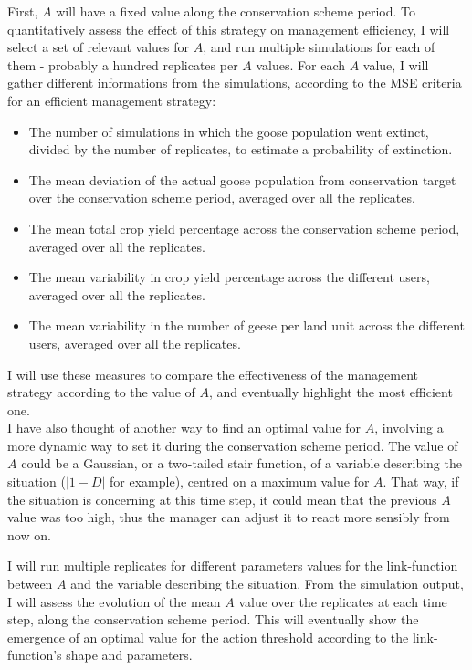 \documentclass[12pt,a4paper]{article}
\begin{document}
First, $A$ will have a fixed value along the conservation scheme period.
To quantitatively assess the effect of this strategy on management efficiency, I will select a set of relevant values for $A$, and run multiple simulations for each of them - probably a hundred replicates per $A$ values.
For each $A$ value, I will gather different informations from the simulations, according to the MSE criteria for an efficient management strategy:
\begin{itemize}
	\item The number of simulations in which the goose population went extinct, divided by the number of replicates, to estimate a probability of extinction.
	\item The mean deviation of the actual goose population from conservation target over the conservation scheme period, averaged over all the replicates.
	\item The mean total crop yield percentage across the conservation scheme period, averaged over all the replicates.
	\item The mean variability in crop yield percentage across the different users, averaged over all the replicates.
	\item The mean variability in the number of geese per land unit across the different users, averaged over all the replicates.
\end{itemize}
I will use these measures to compare the effectiveness of the management strategy according to the value of $A$, and eventually highlight the most efficient one.\\

I have also thought of another way to find an optimal value for $A$, involving a more dynamic way to set it during the conservation scheme period.
The value of $A$ could be a Gaussian, or a two-tailed stair function, of a variable describing the situation ($|1-D|$ for example), centred on a maximum value for $A$.
That way, if the situation is concerning at this time step, it could mean that the previous $A$ value was too high, thus the manager can adjust it to react more sensibly from now on.

I will run multiple replicates for different parameters values for the link-function between $A$ and the variable describing the situation.
From the simulation output, I will assess the evolution of the mean $A$ value over the replicates at each time step, along the conservation scheme period.
This will eventually show the emergence of an optimal value for the action threshold according to the link-function's shape and parameters.\\
\end{document}
